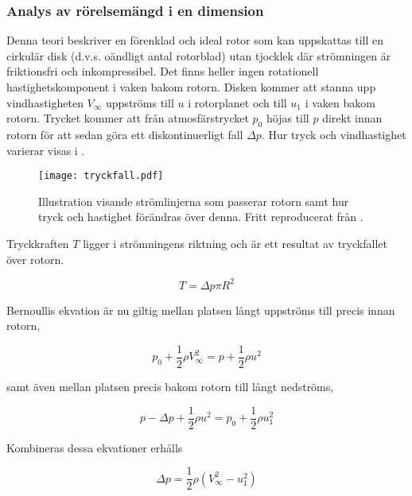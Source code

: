 \subsubsection{Analys av rörelsemängd i en dimension}
\label{1dmomentumteori}

Denna teori beskriver en förenklad och ideal rotor som kan uppskattas till en cirkulär disk (d.v.s. oändligt antal rotorblad) utan tjocklek där strömningen är friktionsfri och inkompressibel. Det finns heller ingen rotationell hastighetskomponent i vaken bakom rotorn. Disken kommer att stanna upp vindhastigheten $V_{\infty}$ uppströms till $u$ i rotorplanet och till $u_1$ i vaken bakom rotorn. Trycket kommer att från atmosfärstrycket $p_0$ höjas till $p$ direkt innan rotorn för att sedan göra ett diskontinuerligt fall $\Delta p$. Hur tryck och vindhastighet varierar visas i .

\begin{figure}[!htb]
  \centering
  \texttt{[image: tryckfall.pdf]}
  \caption{Illustration visande strömlinjerna som passerar rotorn samt hur tryck och hastighet förändras över denna. Fritt reproducerat från \citet{hansen}.}
  \label{tryckfall}
\end{figure}

Tryckkraften $T$ ligger i strömningens riktning och är ett resultat av tryckfallet över rotorn.

\begin{equation}\label{thrust} T = \Delta p \pi R^2 \end{equation}

Bernoullis ekvation är nu giltig mellan platsen långt uppströms till precis innan rotorn,

\begin{equation}\label{fore}
p_0 + \frac{1}{2}\rho V_{\infty}^2 = p + \frac{1}{2}\rho u^2
\end{equation}

samt även mellan platsen precis bakom rotorn till långt nedströms,

\begin{equation}\label{efter}
p - \Delta p + \frac{1}{2}\rho u^2 = p_0 + \frac{1}{2} \rho u_1^2
\end{equation}

Kombineras dessa ekvationer erhålls

\begin{equation}\label{pdrop}
\Delta p = \frac{1}{2}\rho (V_{\infty}^2 - u_1^2)
\end{equation}

